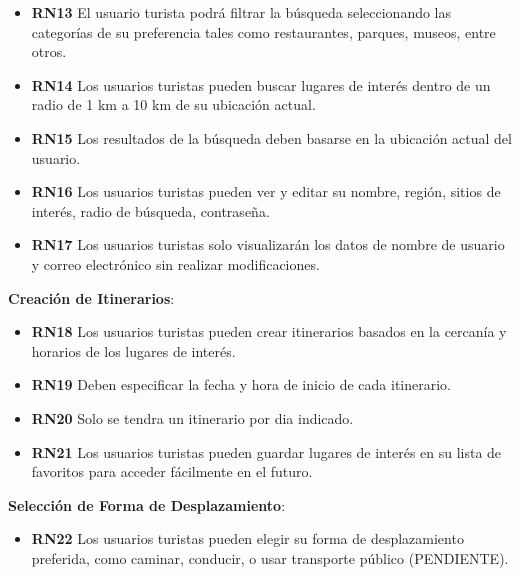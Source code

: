 \documentclass{article}
\begin{document}
    \begin{itemize}
        \item \textbf{RN13} El usuario turista podrá filtrar la búsqueda seleccionando las categorías de su preferencia tales como restaurantes, parques, museos, entre otros.
        \item \textbf{RN14} Los usuarios turistas pueden buscar lugares de interés dentro de un radio de 1 km a 10 km de su ubicación actual.
        \item \textbf{RN15} Los resultados de la búsqueda deben basarse en la ubicación actual del usuario.
    \end{itemize}

    \begin{itemize}
        \item \textbf{RN16} Los usuarios turistas pueden ver y editar su nombre, región, sitios de interés, radio de búsqueda, contraseña.
        \item \textbf{RN17} Los usuarios turistas solo visualizarán los datos de nombre de usuario y correo electrónico sin realizar modificaciones.
    \end{itemize}

    \item \textbf{Creación de Itinerarios}:
    \begin{itemize}
        \item \textbf{RN18} Los usuarios turistas pueden crear itinerarios basados en la cercanía y horarios de los lugares de interés.
        \item \textbf{RN19} Deben especificar la fecha y hora de inicio de cada itinerario.
        \item\textbf{RN20}  Solo se tendra un itinerario por dia indicado.
         
    \end{itemize}
    \begin{itemize}
        \item \textbf{RN21} Los usuarios turistas pueden guardar lugares de interés en su lista de favoritos para acceder fácilmente en el futuro.
    \end{itemize}
    
    \item \textbf{Selección de Forma de Desplazamiento}:
    \begin{itemize}
        \item \textbf{RN22} Los usuarios turistas pueden elegir su forma de desplazamiento preferida, como caminar, conducir, o usar transporte público (PENDIENTE).
    \end{itemize}
    
\end{document}

